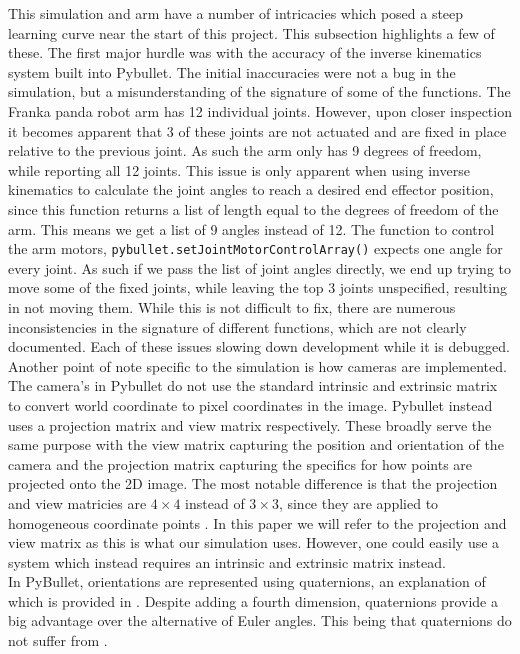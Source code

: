 This simulation and arm have a number of intricacies which posed a steep learning curve near the start of this project. This subsection highlights a few of these. The first major hurdle was with the accuracy of the inverse kinematics system built into Pybullet. The initial inaccuracies were not a bug in the simulation, but a misunderstanding of the signature of some of the functions.
The Franka panda robot arm has 12 individual joints. However, upon closer inspection it becomes apparent that 3 of these joints are not actuated and are fixed in place relative to the previous joint. As such the arm only has 9 degrees of freedom, while reporting all 12 joints. This issue is only apparent when using inverse kinematics to calculate the joint angles to reach a desired end effector position, since this function returns a list of length equal to the degrees of freedom of the arm. This means we get a list of 9 angles instead of 12. The function to control the arm motors, \verb|pybullet.setJointMotorControlArray()| expects one angle for every joint. As such if we pass the list of joint angles directly, we end up trying to move some of the fixed joints, while leaving the top 3 joints unspecified, resulting in not moving them. While this is not difficult to fix, there are numerous inconsistencies in the signature of different functions, which are not clearly documented. Each of these issues slowing down development while it is debugged.\\

Another point of note specific to the simulation is how cameras are implemented. The camera's in Pybullet do not use the standard intrinsic and extrinsic matrix to convert world coordinate to pixel coordinates in the image. Pybullet instead uses a projection matrix and view matrix respectively. These broadly serve the same purpose with the view matrix capturing the position and orientation of the camera and the projection matrix capturing the specifics for how points are projected onto the 2D image. The most notable difference is that the projection and view matricies are $4\times4$ instead of $3\times3$, since they are applied to homogeneous coordinate points \cite{homogenous-coords}. In this paper we will refer to the projection and view matrix as this is what our simulation uses. However, one could easily use a system which instead requires an intrinsic and extrinsic matrix instead.\\

In PyBullet, orientations are represented using quaternions, \cite{quaternions, orientations} an explanation of which is provided in . Despite adding a fourth dimension, quaternions provide a big advantage over the alternative of Euler angles. This being that quaternions do not suffer from  \cite{gimbal, gimbal-lock}.

